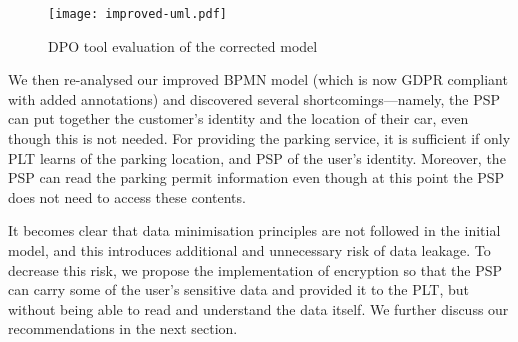 \begin{figure}[!hb]
\begin{center}
  \texttt{[image: improved-uml.pdf]}
  \caption{DPO tool evaluation of the corrected model}
  \label{fig:improved-uml}
\end{center}
\end{figure}

We then re-analysed our improved BPMN model (which is now GDPR compliant with
added annotations) and discovered several shortcomings---namely, the PSP can put
together the customer's identity and the location of their car, even though this
is not needed. For providing the parking service, it is sufficient if only PLT
learns of the parking location, and PSP of the user's identity. Moreover, the
PSP can read the parking permit information even though at this point the PSP
does not need to access these contents.

It becomes clear that data minimisation principles are not followed in the
initial model, and this introduces additional and unnecessary risk of data
leakage. To decrease this risk, we propose the implementation of encryption so
that the PSP can carry some of the user's sensitive data and provided it to the
PLT, but without being able to read and understand the data itself. We further
discuss our recommendations in the next section.
